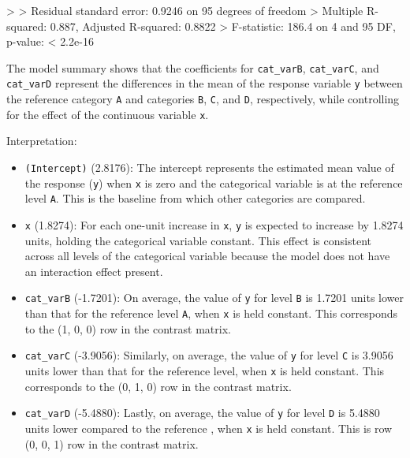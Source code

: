 \documentclass[
  letterpaper,
]{book}
\newenvironment{Shaded}{\begin{snugshade}}{\end{snugshade}}
\newcommand{\DecValTok}[1]{\textcolor[rgb]{0.68,0.00,0.00}{#1}}
\newcommand{\ErrorTok}[1]{\textcolor[rgb]{0.68,0.00,0.00}{#1}}
\newcommand{\FloatTok}[1]{\textcolor[rgb]{0.68,0.00,0.00}{#1}}
\newcommand{\NormalTok}[1]{\textcolor[rgb]{0.00,0.23,0.31}{#1}}
\newcommand{\SpecialCharTok}[1]{\textcolor[rgb]{0.37,0.37,0.37}{#1}}
\providecommand{\tightlist}{%
  \setlength{\itemsep}{0pt}\setlength{\parskip}{0pt}}\usepackage{longtable,booktabs,array}
\begin{document}
\begin{Shaded}
\begin{Highlighting}[]
\SpecialCharTok{\textgreater{}} 
\ErrorTok{\textgreater{}}\NormalTok{ Residual standard error}\SpecialCharTok{:} \FloatTok{0.9246}\NormalTok{ on }\DecValTok{95}\NormalTok{ degrees of freedom}
\SpecialCharTok{\textgreater{}}\NormalTok{ Multiple R}\SpecialCharTok{{-}}\NormalTok{squared}\SpecialCharTok{:}  \FloatTok{0.887}\NormalTok{,   Adjusted R}\SpecialCharTok{{-}}\NormalTok{squared}\SpecialCharTok{:}  \FloatTok{0.8822} 
\SpecialCharTok{\textgreater{}}\NormalTok{ F}\SpecialCharTok{{-}}\NormalTok{statistic}\SpecialCharTok{:} \FloatTok{186.4}\NormalTok{ on }\DecValTok{4}\NormalTok{ and }\DecValTok{95}\NormalTok{ DF,  p}\SpecialCharTok{{-}}\NormalTok{value}\SpecialCharTok{:} \ErrorTok{\textless{}} \FloatTok{2.2e{-}16}
\end{Highlighting}
\end{Shaded}

The model summary shows that the coefficients for \texttt{cat\_varB},
\texttt{cat\_varC}, and \texttt{cat\_varD} represent the differences in
the mean of the response variable \texttt{y} between the reference
category \texttt{A} and categories \texttt{B}, \texttt{C}, and
\texttt{D}, respectively, while controlling for the effect of the
continuous variable \texttt{x}.

Interpretation:

\begin{itemize}
\tightlist
\item
  \texttt{(Intercept)} (2.8176): The intercept represents the estimated
  mean value of the response (\texttt{y}) when \texttt{x} is zero and
  the categorical variable is at the reference level \texttt{A}. This is
  the baseline from which other categories are compared.
\item
  \texttt{x} (1.8274): For each one-unit increase in \texttt{x},
  \texttt{y} is expected to increase by 1.8274 units, holding the
  categorical variable constant. This effect is consistent across all
  levels of the categorical variable because the model does not have an
  interaction effect present.
\item
  \texttt{cat\_varB} (-1.7201): On average, the value of \texttt{y} for
  level \texttt{B} is 1.7201 units lower than that for the reference
  level \texttt{A}, when \texttt{x} is held constant. This corresponds
  to the (1, 0, 0) row in the contrast matrix.
\item
  \texttt{cat\_varC} (-3.9056): Similarly, on average, the value of
  \texttt{y} for level \texttt{C} is 3.9056 units lower than that for
  the reference level, when \texttt{x} is held constant. This
  corresponds to the (0, 1, 0) row in the contrast matrix.
\item
  \texttt{cat\_varD} (-5.4880): Lastly, on average, the value of
  \texttt{y} for level \texttt{D} is 5.4880 units lower compared to the
  reference , when \texttt{x} is held constant. This is row (0, 0, 1)
  row in the contrast matrix.
\end{itemize}
\end{document}
